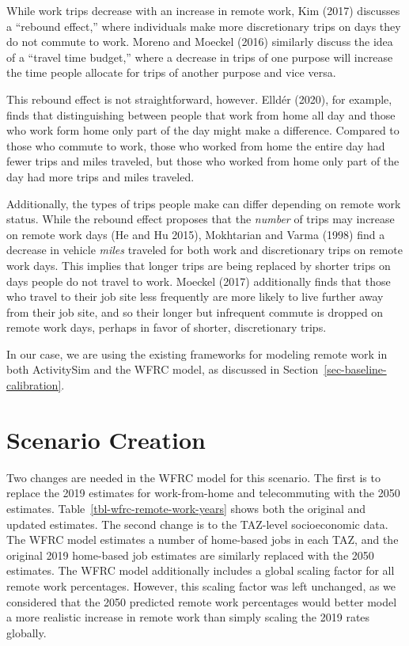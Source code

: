 \documentclass[fancy, oneside, mastersfancy, ms]{byuthesis}
\begin{document}
While work trips decrease with an increase in remote work, Kim (2017)
discusses a ``rebound effect,'' where individuals make more
discretionary trips on days they do not commute to work. Moreno and
Moeckel (2016) similarly discuss the idea of a ``travel time budget,''
where a decrease in trips of one purpose will increase the time people
allocate for trips of another purpose and vice versa.

This rebound effect is not straightforward, however. Elldér (2020), for
example, finds that distinguishing between people that work from home
all day and those who work form home only part of the day might make a
difference. Compared to those who commute to work, those who worked from
home the entire day had fewer trips and miles traveled, but those who
worked from home only part of the day had more trips and miles traveled.

Additionally, the types of trips people make can differ depending on
remote work status. While the rebound effect proposes that the
\emph{number} of trips may increase on remote work days (He and Hu
2015), Mokhtarian and Varma (1998) find a decrease in vehicle
\emph{miles} traveled for both work and discretionary trips on remote
work days. This implies that longer trips are being replaced by shorter
trips on days people do not travel to work. Moeckel (2017) additionally
finds that those who travel to their job site less frequently are more
likely to live further away from their job site, and so their longer but
infrequent commute is dropped on remote work days, perhaps in favor of
shorter, discretionary trips.

In our case, we are using the existing frameworks for modeling remote
work in both ActivitySim and the WFRC model, as discussed in
Section~\ref{sec-baseline-calibration}.

\section{Scenario Creation}\label{scenario-creation-2}

Two changes are needed in the WFRC model for this scenario. The first is
to replace the 2019 estimates for work-from-home and telecommuting with
the 2050 estimates. Table~\ref{tbl-wfrc-remote-work-years} shows both
the original and updated estimates. The second change is to the
TAZ-level socioeconomic data. The WFRC model estimates a number of
home-based jobs in each TAZ, and the original 2019 home-based job
estimates are similarly replaced with the 2050 estimates. The WFRC model
additionally includes a global scaling factor for all remote work
percentages. However, this scaling factor was left unchanged, as we
considered that the 2050 predicted remote work percentages would better
model a more realistic increase in remote work than simply scaling the
2019 rates globally.
\end{document}
